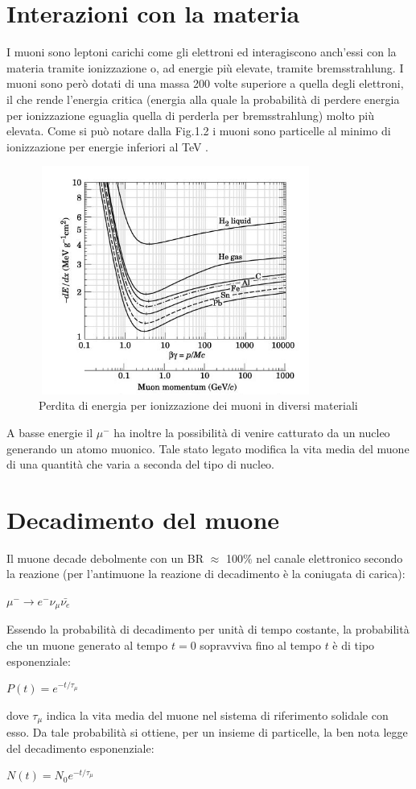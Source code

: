 \documentclass{standalone}
\begin{document}
\section{Interazioni con la materia}
I muoni sono leptoni carichi come gli elettroni ed interagiscono anch'essi con la materia tramite ionizzazione o, ad energie pi\`u elevate, tramite bremsstrahlung.
I muoni sono per\`o dotati di una massa 200 volte superiore a quella degli elettroni, il che rende l'energia critica (energia alla quale la probabilit\`a di perdere energia per ionizzazione eguaglia quella di perderla per bremsstrahlung) molto pi\`u elevata.
Come si pu\`o notare dalla Fig.1.2 i muoni sono particelle al minimo di ionizzazione per energie inferiori al TeV \cite{Groom}.
\begin{figure}[H]
	\centering
	\includegraphics[width=9cm, height=7.5cm]{images/Energyloss.jpg}
	\caption{Perdita di energia per ionizzazione dei muoni in diversi materiali}
\end{figure}
A basse energie il ${\mu}^-$ ha inoltre la possibilit\`a di venire catturato da un nucleo generando un atomo muonico.
Tale stato legato modifica la vita media del muone di una quantit\`a che varia a seconda del tipo di nucleo.
\section{Decadimento del muone}
Il muone decade debolmente con un BR $\approx$ 100$\%$ nel canale elettronico secondo la reazione (per l'antimuone la reazione di decadimento \`e la coniugata di carica):\\
\centerline{$\mu^- \rightarrow e^- \nu_\mu \bar{\nu_e}$}
Essendo la probabilit\`a di decadimento per unit\`a di tempo costante, la probabilit\`a che un muone generato al tempo $t=0$ sopravviva fino al tempo $t$ \`e di tipo esponenziale:\\
\centerline{$P(t)=e^{-t/\tau_\mu}$}
dove $\tau_\mu$ indica la vita media del muone nel sistema di riferimento solidale con esso.
Da tale probabilit\`a si ottiene, per un insieme di particelle, la ben nota legge del decadimento esponenziale: \cite{Bendiscioli} \\
\centerline{$N(t)=N_0e^{-t/\tau_\mu}$}
\end{document}
